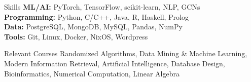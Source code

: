 \documentclass{resume}
\begin{document}


\begin{rSection}{Skills}
\textbf{ML/AI:} PyTorch, TensorFlow, scikit-learn, NLP, GCNs \\
\textbf{Programming:} Python, C/C++, Java, R, Haskell, Prolog \\
\textbf{Data:} PostgreSQL, MongoDB, MySQL, Pandas, NumPy \\
\textbf{Tools:} Git, Linux, Docker, NixOS, Wordpress \\
\end{rSection}
\begin{rSection}{Relevant Courses}
Randomized Algorithms, Data Mining \& Machine Learning, Modern Information Retrieval, Artificial Intelligence, Database Design, Bioinformatics, Numerical Computation, Linear Algebra
\end{rSection}
\end{document}
